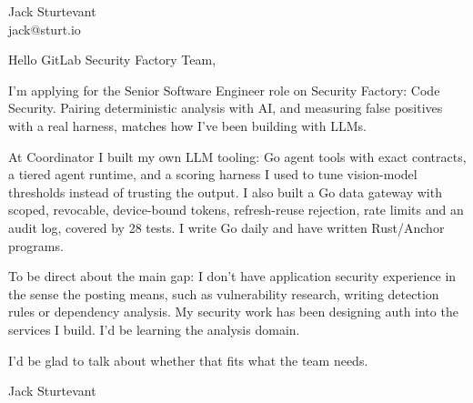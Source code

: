 \documentclass[11pt]{article}
\begin{document}
\raggedright

{\namefont\fontsize{20pt}{24pt}\selectfont Jack Sturtevant}\\[-0.3em]
jack@sturt.io

\vspace{1.2em}

Hello GitLab Security Factory Team,

I'm applying for the Senior Software Engineer role on Security Factory: Code Security. Pairing deterministic analysis with AI, and measuring false positives with a real harness, matches how I've been building with LLMs.

At Coordinator I built my own LLM tooling: Go agent tools with exact contracts, a tiered agent runtime, and a scoring harness I used to tune vision-model thresholds instead of trusting the output. I also built a Go data gateway with scoped, revocable, device-bound tokens, refresh-reuse rejection, rate limits and an audit log, covered by 28 tests. I write Go daily and have written Rust/Anchor programs.

To be direct about the main gap: I don't have application security experience in the sense the posting means, such as vulnerability research, writing detection rules or dependency analysis. My security work has been designing auth into the services I build. I'd be learning the analysis domain.

I'd be glad to talk about whether that fits what the team needs.

\vspace{0.6em}
Jack Sturtevant
\end{document}
